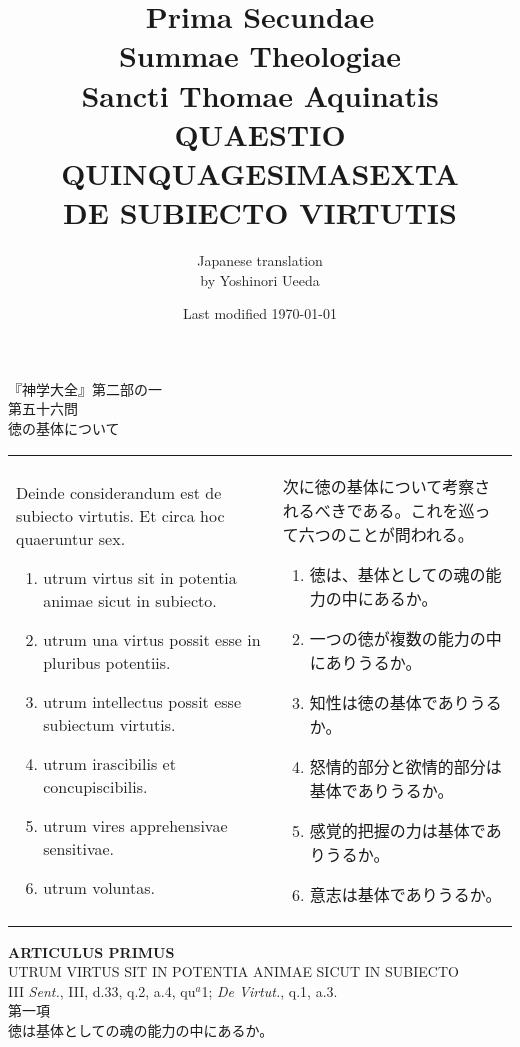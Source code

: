 \documentclass[10pt]{jsarticle}
\title{{\bf Prima Secundae}\\{\HUGE Summae Theologiae}\\Sancti Thomae
Aquinatis\\{\sffamily QUAESTIO QUINQUAGESIMASEXTA}\\{\bf DE SUBIECTO VIRTUTIS}}
\author{Japanese translation\\by Yoshinori {\sc Ueeda}}
\date{Last modified \today}
\begin{document}
\maketitle
\thispagestyle{empty}
\begin{center}
{\Large 『神学大全』第二部の一\\第五十六問\\徳の基体について}
\end{center}

\begin{longtable}{p{21em}p{21em}}
Deinde considerandum est de subiecto virtutis. Et circa hoc quaeruntur sex. 

\begin{enumerate}
 \item utrum virtus sit in potentia animae sicut in subiecto.
 \item utrum una virtus possit esse in pluribus potentiis.
 \item utrum intellectus possit esse subiectum virtutis.
 \item utrum irascibilis et concupiscibilis.
 \item utrum vires apprehensivae sensitivae.
 \item utrum voluntas.
\end{enumerate}

&

次に徳の基体について考察されるべきである。これを巡って六つのことが問われる。

\begin{enumerate}
 \item 徳は、基体としての魂の能力の中にあるか。
 \item 一つの徳が複数の能力の中にありうるか。
 \item 知性は徳の基体でありうるか。
 \item 怒情的部分と欲情的部分は基体でありうるか。
 \item 感覚的把握の力は基体でありうるか。
 \item 意志は基体でありうるか。
\end{enumerate}
\end{longtable}

\newpage
{}
\begin{center}
{\Large {\bf ARTICULUS PRIMUS}}\\
{\large UTRUM VIRTUS SIT IN POTENTIA ANIMAE SICUT IN SUBIECTO}\\
{\footnotesize III {\itshape Sent.}, III, d.33, q.2, a.4, qu$^{a}$1; {\itshape De Virtut.}, q.1, a.3.}\\
{\Large 第一項\\徳は基体としての魂の能力の中にあるか。}
\end{center}
\end{document}
